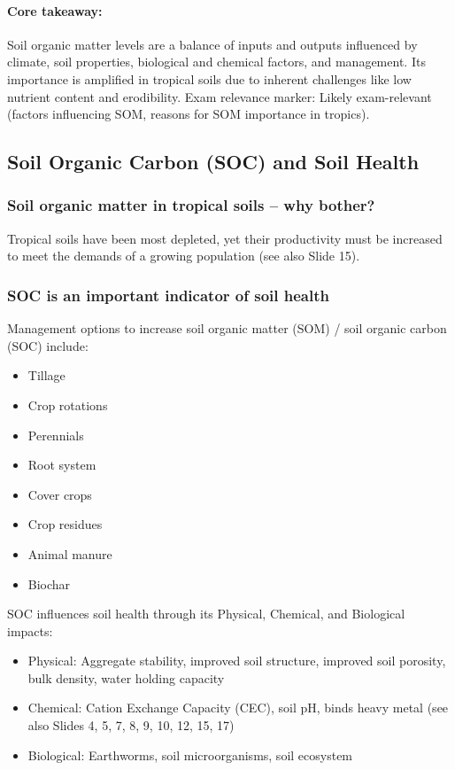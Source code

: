 \paragraph*{Core takeaway:} 
Soil organic matter levels are a balance of inputs and outputs influenced by climate, soil properties, biological and chemical factors, and management. Its importance is amplified in tropical soils due to inherent challenges like low nutrient content and erodibility. Exam relevance marker: Likely exam-relevant (factors influencing SOM, reasons for SOM importance in tropics).

\subsection{Soil Organic Carbon (SOC) and Soil Health} \subsubsection{Soil organic matter in tropical soils – why bother?} 
Tropical soils have been most depleted, yet their productivity must be increased to meet the demands of a growing population (see also Slide 15).

\subsubsection{SOC is an important indicator of soil health}  
Management options to increase soil organic matter (SOM) / soil organic carbon (SOC) include: 

\begin{itemize} 
    \item Tillage 
    \item Crop rotations 
    \item Perennials 
    \item Root system 
    \item Cover crops 
    \item Crop residues 
    \item Animal manure 
    \item Biochar 
\end{itemize} 

\vspace*{1em}
SOC influences soil health through its Physical, Chemical, and Biological impacts: 

\begin{itemize} 
    \item Physical: Aggregate stability, improved soil structure, improved soil porosity, bulk density, water holding capacity 
    \item Chemical: Cation Exchange Capacity (CEC), soil pH, binds heavy metal (see also Slides 4, 5, 7, 8, 9, 10, 12, 15, 17) 
    \item Biological: Earthworms, soil microorganisms, soil ecosystem 
\end{itemize}

